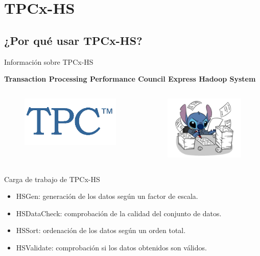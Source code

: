 
\section{TPCx-HS}

	\subsection*{¿Por qué usar TPCx-HS?}

		\begin{frame}{Información sobre TPCx-HS}
			\begin{tcolorbox}[colback=ChetwodeBlue!10,colframe=ChetwodeBlue!60]
				\fontsize{8}{8}\selectfont
				\centering
				\textbf{Transaction Processing Performance Council Express Hadoop System}
			\end{tcolorbox}
			\begin{columns}[c]
				\begin{figure}[h]
					\centering
					\includegraphics[width=5cm]{./Images/tpc-logo.png}
				\end{figure}
			
			
				\begin{figure}[h]
							\centering
							\includegraphics[width=4cm]{./Images/hardwork.png}
						\end{figure}
					\end{columns}
			
			{\color{ChetwodeBlue}\large Carga de trabajo de TPCx-HS}
			
			\begin{itemize}
				\fontsize{8}{10}\selectfont
				\item HSGen: generación de los datos según un factor de escala.
				\item HSDataCheck: comprobación de la calidad del conjunto de datos.
				\item HSSort: ordenación de los datos según un orden total.
				\item HSValidate: comprobación si los datos obtenidos son válidos.
			\end{itemize}		
		\end{frame}
	
